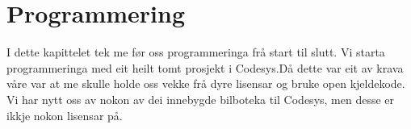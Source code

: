 \chapter{Programmering}
\thispagestyle{fancy}
I dette kapittelet tek me før oss programmeringa frå start til slutt.
Vi starta programmeringa med eit heilt tomt prosjekt i \gls{Codesys}.Då dette var eit av krava våre var at me skulle
holde oss vekke frå dyre lisensar og bruke open kjeldekode. Vi har nytt oss av nokon av dei innebygde bilboteka til 
\gls{Codesys}, men desse er ikkje nokon lisensar på.


